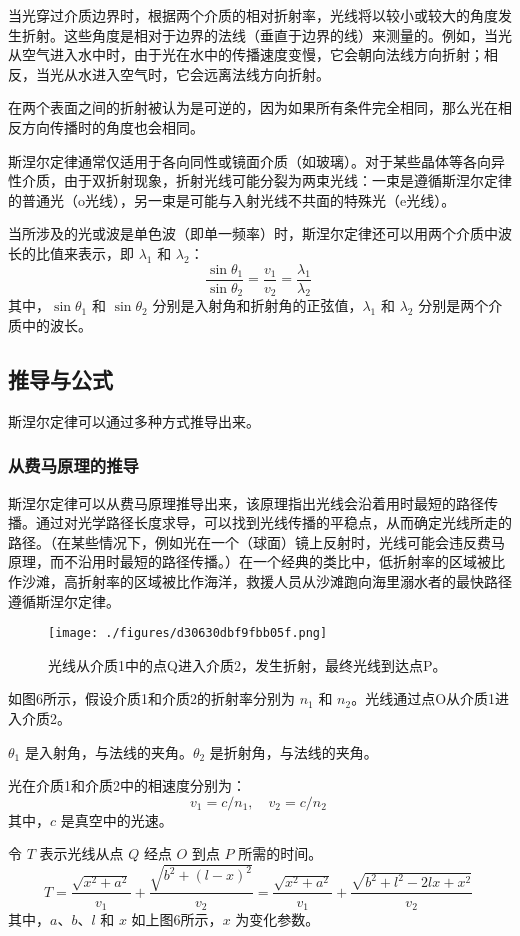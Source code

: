 当光穿过介质边界时，根据两个介质的相对折射率，光线将以较小或较大的角度发生折射。这些角度是相对于边界的法线（垂直于边界的线）来测量的。例如，当光从空气进入水中时，由于光在水中的传播速度变慢，它会朝向法线方向折射；相反，当光从水进入空气时，它会远离法线方向折射。

在两个表面之间的折射被认为是可逆的，因为如果所有条件完全相同，那么光在相反方向传播时的角度也会相同。

斯涅尔定律通常仅适用于各向同性或镜面介质（如玻璃）。对于某些晶体等各向异性介质，由于双折射现象，折射光线可能分裂为两束光线：一束是遵循斯涅尔定律的普通光（o光线），另一束是可能与入射光线不共面的特殊光（e光线）。

当所涉及的光或波是单色波（即单一频率）时，斯涅尔定律还可以用两个介质中波长的比值来表示，即 \(\lambda_1\) 和 \(\lambda_2\)：
\[
\frac{\sin \theta_1}{\sin \theta_2} = \frac{v_1}{v_2} = \frac{\lambda_1}{\lambda_2}~
\]
其中，\(\sin \theta_1\) 和 \(\sin \theta_2\) 分别是入射角和折射角的正弦值，\(\lambda_1\) 和 \(\lambda_2\) 分别是两个介质中的波长。
\subsection{推导与公式}
斯涅尔定律可以通过多种方式推导出来。
\subsubsection{从费马原理的推导}  
斯涅尔定律可以从费马原理推导出来，该原理指出光线会沿着用时最短的路径传播。通过对光学路径长度求导，可以找到光线传播的平稳点，从而确定光线所走的路径。（在某些情况下，例如光在一个（球面）镜上反射时，光线可能会违反费马原理，而不沿用时最短的路径传播。）在一个经典的类比中，低折射率的区域被比作沙滩，高折射率的区域被比作海洋，救援人员从沙滩跑向海里溺水者的最快路径遵循斯涅尔定律。
\begin{figure}[ht]
\centering
\texttt{[image: ./figures/d30630dbf9fbb05f.png]}
\caption{光线从介质1中的点Q进入介质2，发生折射，最终光线到达点P。} \label{fig_SNR_7}
\end{figure}
如图6所示，假设介质1和介质2的折射率分别为 \( n_1 \) 和 \( n_2 \)。光线通过点O从介质1进入介质2。

\( \theta_1 \) 是入射角，与法线的夹角。\( \theta_2 \) 是折射角，与法线的夹角。

光在介质1和介质2中的相速度分别为：
\[
v_1 =c/n_1, \quad v_2 = c/n_2~
\]
其中，\( c \) 是真空中的光速。

令 \( T \) 表示光线从点 \( Q \) 经点 \( O \) 到点 \( P \) 所需的时间。
\[
T = \frac{\sqrt{x^2 + a^2}}{v_1} + \frac{\sqrt{b^2 + (l - x)^2}}{v_2} = \frac{\sqrt{x^2 + a^2}}{v_1} + \frac{\sqrt{b^2 + l^2 - 2lx + x^2}}{v_2}~
\]
其中，\( a \)、\( b \)、\( l \) 和 \( x \) 如上图6所示，\( x \) 为变化参数。

